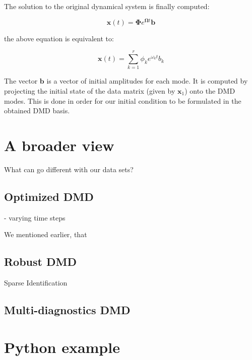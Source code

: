 \documentclass[10pt,twocolumn]{article}
\begin{document}
The solution to the original dynamical system is finally computed:

\begin{equation} \label{eq:x-solution-matrix}
\mathbf{x}(t) = \mathbf{\Phi} e^{\mathbf{\Omega} t} \mathbf{b}
\end{equation}

the above equation is equivalent to:

\begin{equation} \label{eq:x-solution-summation}
\mathbf{x}(t)  = \sum_{k=1}^{r} \phi_k e^{\omega_k t} b_k
\end{equation}

The vector $\mathbf{b}$ is a vector of initial amplitudes for each mode. It is computed by projecting the initial state of the data matrix (given by $\mathbf{x}_1$) onto the DMD modes. This is done in order for our initial condition to be formulated in the obtained DMD basis.



\section{A broader view} \label{sec:view}

What can go different with our data sets?

\subsection{Optimized DMD}

- varying time steps

We mentioned earlier, that 

\subsection{Robust DMD}



Sparse Identification




\subsection{Multi-diagnostics DMD}

\section{Python example}



\appendix
\end{document}
